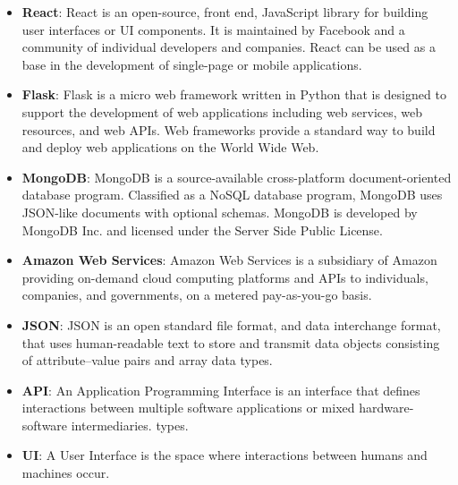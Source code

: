\documentclass[12pt, a4]{report}
\begin{document}

\newpage
{}
\begin{itemize}
    \item \textbf{React}: React is an open-source, front end, JavaScript library for building user interfaces or UI components. It is maintained by Facebook and a community of individual developers and companies. React can be used as a base in the development of single-page or mobile applications.
    \item \textbf{Flask}: Flask is a micro web framework written in Python that is designed to support the development of web applications including web services, web resources, and web APIs. Web frameworks provide a standard way to build and deploy web applications on the World Wide Web.
    \item \textbf{MongoDB}: MongoDB is a source-available cross-platform document-oriented database program. Classified as a NoSQL database program, MongoDB uses JSON-like documents with optional schemas. MongoDB is developed by MongoDB Inc. and licensed under the Server Side Public License.
    \item \textbf{Amazon Web Services}: Amazon Web Services is a subsidiary of Amazon providing on-demand cloud computing platforms and APIs to individuals, companies, and governments, on a metered pay-as-you-go basis.
    \item \textbf{JSON}: JSON is an open standard file format, and data interchange format, that uses human-readable text to store and transmit data objects consisting of attribute–value pairs and array data types.
    \item \textbf{API}: An Application Programming Interface is an interface that defines interactions between multiple software applications or mixed hardware-software intermediaries. types.
    \item \textbf{UI}: A User Interface is the space where interactions between humans and machines occur.
\end{itemize}
\end{document}
